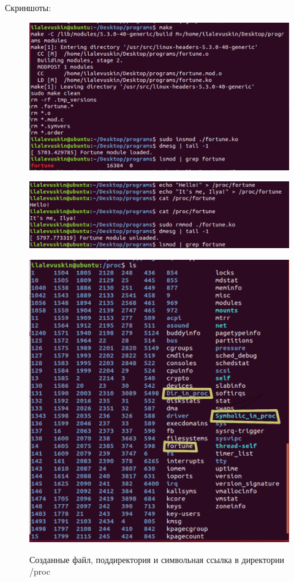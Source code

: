 \documentclass[a4paper,12pt]{article}
\begin{document}
	\newpage
	
	Скриншоты:
	
	\begin{figure}[h!]
		\begin{center}
			{\includegraphics[scale = 0.7]{make.png}}
			\label{ris:make}
		\end{center}
	\end{figure}

	\begin{figure}[h!]
		\begin{center}
			{\includegraphics[scale = 0.7]{hello.png}}
			\label{ris:hello}
		\end{center}
	\end{figure}

	\begin{figure}[h!]
		\begin{center}
			{\includegraphics[scale = 0.7]{example.png}}
			\label{ris:example}
		\end{center}
	\caption{Созданные файл, поддиректория и символьная ссылка в директории /proc}
	\end{figure}
			
\end{document}
